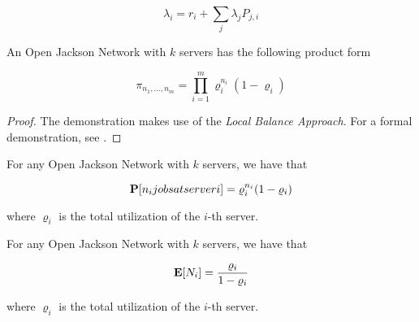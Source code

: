 \begin{equation}
\label{eqn:Open-Jackson-Network-Total-Arrival-Rate}
\lambda_{i} = r_{i} + \sum_{j} \lambda_{j} P_{j,i}
\end{equation}

\begin{theorem}
\label{thm:Open-Jackson-Network-Product-Form}
	An Open Jackson Network with $k$ servers has the following product form
	
	\begin{equation}
	\label{eqn:Open-Jackson-Network-Product-Form}
	\pi_{n_{1},...,n_{m}} = \prod_{i=1}^{m} \varrho_{i}^{n_{i}} (1-\varrho_{i})
	\end{equation}
	
	\begin{proof}
		The demonstration makes use of the \textit{Local Balance Approach}.
		For a formal demonstration, see \cite{harchol2013performance}.
	\end{proof}
\end{theorem}

\begin{corollary}
\label{cor:Open-Jackson-Network-Probability-Jobs-Server}
	For any Open Jackson Network with $k$ servers, we have that
	
	\begin{equation}
	\label{eqn:Open-Jackson-Network-Probability-Jobs-Server}
	\probability{n_{i} jobs at server i} = \varrho_{i}^{n_{i}} (1-\varrho_{i})
	\end{equation}
	
	where $\varrho_{i}$ is the total utilization of the $i$-th server.
\end{corollary}

\begin{corollary}
\label{cor:Open-Jackson-Network-Mean-Server-Jobs}	
	For any Open Jackson Network with $k$ servers, we have that
	
	\begin{equation}
	\label{eqn:Open-Jackson-Network-Mean-Server-Jobs}
	\expected{N_{i}} = \frac{\varrho_{i}}{1 - \varrho_{i}}
	\end{equation}
	
	where $\varrho_{i}$ is the total utilization of the $i$-th server.
\end{corollary}






